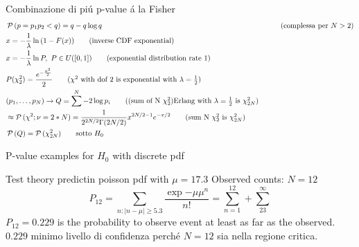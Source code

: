\documentclass[asd-beamer.tex]{subfiles}
\begin{document}
\begin{frame}{Combinazione di pi\'u p-value \'a la Fisher}
	\begin{align*}
	&\prob{(p=p_1p_2<q)}=q-q\log{q}&\tag{complessa per $N>2$}\\
	&x=-\frac{1}{\lambda}\ln{(1-F(x))}\tag{inverse CDF exponential}\\
	&x=-\frac{1}{\lambda}\ln{P},\ P\in U([0,1])\tag{exponential distribution rate 1}\\
&P(\chi^2_2)=\frac{\exp{-\frac{x^2}{2}}}{2}\tag{$\chi^2$ with dof 2 is exponential with $\lambda=\frac{1}{2}$}\\
	&(p_1,\ldots,p_N)\to Q=\sum^N-2\log{p_i}\tag{(sum of N $\chi_2^2$)Erlang with $\lambda=\frac{1}{2}$ is $\chi^2_{2N}$}\\%
	&\approx\prob{(\chi^2;\nu=2*N)}=\frac{1}{2\expy{2N/2}\Gamma(2N/2)}x\expy{2N/2-1}\exp{-x/2}\tag{sum N $\chi^2_2$ is $\chi^2_{2N}$}\\
	&\prob{(Q)}=\prob{(\chi^2_{2N})}\tag*{sotto $H_0$}
	\end{align*}
\end{frame}

\begin{wordonframe}{P-value examples for $H_0$ with discrete pdf}
\begin{block}{Test theory predictin poisson pdf with $\mu=17.3$}
Observed counts: $N=12$
\[P_{12}=\sum_{n: |n-\mu|\geq5.3}\frac{\exp{-\mu}\mu^n}{n!}=\sum_{n=1}^{12}+\sum_{23}^{\infty}\]
$P_{12}=0.229$ is the probability to observe event at least as far as the observed.
$0.229$ minimo livello di confidenza perch\'e $N=12$ sia nella regione critica.
\end{block}
\end{wordonframe}
\end{document}
